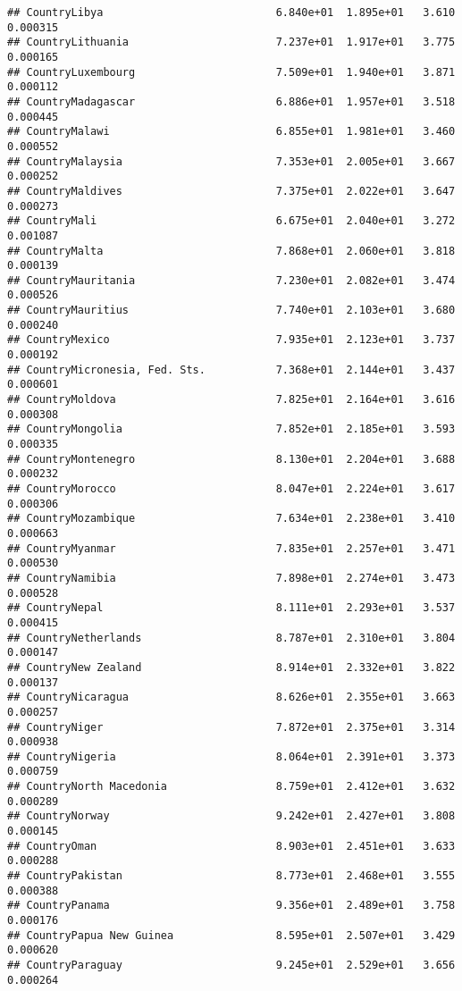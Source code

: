 \documentclass[
]{article}
\begin{document}
\begin{verbatim}
## CountryLibya                           6.840e+01  1.895e+01   3.610 0.000315
## CountryLithuania                       7.237e+01  1.917e+01   3.775 0.000165
## CountryLuxembourg                      7.509e+01  1.940e+01   3.871 0.000112
## CountryMadagascar                      6.886e+01  1.957e+01   3.518 0.000445
## CountryMalawi                          6.855e+01  1.981e+01   3.460 0.000552
## CountryMalaysia                        7.353e+01  2.005e+01   3.667 0.000252
## CountryMaldives                        7.375e+01  2.022e+01   3.647 0.000273
## CountryMali                            6.675e+01  2.040e+01   3.272 0.001087
## CountryMalta                           7.868e+01  2.060e+01   3.818 0.000139
## CountryMauritania                      7.230e+01  2.082e+01   3.474 0.000526
## CountryMauritius                       7.740e+01  2.103e+01   3.680 0.000240
## CountryMexico                          7.935e+01  2.123e+01   3.737 0.000192
## CountryMicronesia, Fed. Sts.           7.368e+01  2.144e+01   3.437 0.000601
## CountryMoldova                         7.825e+01  2.164e+01   3.616 0.000308
## CountryMongolia                        7.852e+01  2.185e+01   3.593 0.000335
## CountryMontenegro                      8.130e+01  2.204e+01   3.688 0.000232
## CountryMorocco                         8.047e+01  2.224e+01   3.617 0.000306
## CountryMozambique                      7.634e+01  2.238e+01   3.410 0.000663
## CountryMyanmar                         7.835e+01  2.257e+01   3.471 0.000530
## CountryNamibia                         7.898e+01  2.274e+01   3.473 0.000528
## CountryNepal                           8.111e+01  2.293e+01   3.537 0.000415
## CountryNetherlands                     8.787e+01  2.310e+01   3.804 0.000147
## CountryNew Zealand                     8.914e+01  2.332e+01   3.822 0.000137
## CountryNicaragua                       8.626e+01  2.355e+01   3.663 0.000257
## CountryNiger                           7.872e+01  2.375e+01   3.314 0.000938
## CountryNigeria                         8.064e+01  2.391e+01   3.373 0.000759
## CountryNorth Macedonia                 8.759e+01  2.412e+01   3.632 0.000289
## CountryNorway                          9.242e+01  2.427e+01   3.808 0.000145
## CountryOman                            8.903e+01  2.451e+01   3.633 0.000288
## CountryPakistan                        8.773e+01  2.468e+01   3.555 0.000388
## CountryPanama                          9.356e+01  2.489e+01   3.758 0.000176
## CountryPapua New Guinea                8.595e+01  2.507e+01   3.429 0.000620
## CountryParaguay                        9.245e+01  2.529e+01   3.656 0.000264

\end{verbatim}
\end{document}
